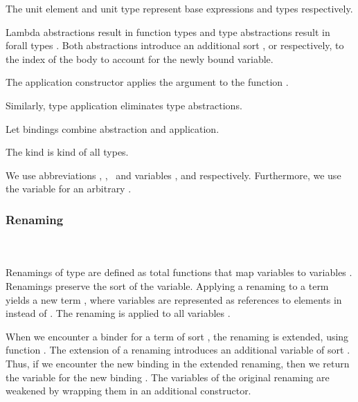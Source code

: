 \noindent The unit element  and unit type  represent base expressions and types respectively. 

\noindent Lambda abstractions   result in function types    and type abstractions   result in forall types  . 
Both abstractions introduce an additional sort , or  respectively, to the index  of the body  to account for the newly bound variable.

\noindent The application constructor    applies the argument  to the function .

\noindent Similarly, type application    eliminates type abstractions. 

\noindent Let bindings     combine abstraction and application. 

\noindent The kind  is kind of all types.

\noindent We use abbreviations \FVar, \FExpr, \FType\ and variables ,  and  respectively. Furthermore, we use the variable  for an arbitrary   .

\subsubsection{Renaming}\hfill\\\\
Renamings  of type    are defined as total functions that map variables    to variables   . 
Renamings preserve the sort  of the variable.
\FoRen
Applying a renaming    to a term    yields a new term   , where variables are represented as references to elements in  instead of .
\Foren
The renaming is applied to all variables .

\noindent When we encounter a binder for a term of sort , the renaming is extended, using function . 
\Forenext
The extension of a renaming introduces an additional variable of sort . Thus, if we encounter the new binding  in the extended renaming, then we return the variable for the new binding . The variables  of the original renaming  are weakened by wrapping them in an additional  constructor.

